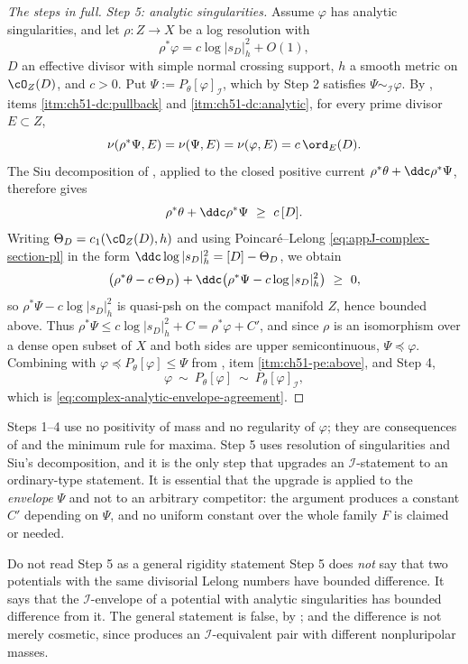 \begin{proof}[The steps in full]
\emph{Step 5: analytic singularities.}  Assume \(\varphi\) has analytic
singularities, and let \(\rho:Z\to X\) be a log resolution with
\[
 \rho^*\varphi=c\log|s_D|_h^2+O(1),
\]
\(D\) an effective divisor with simple normal crossing support, \(h\) a
smooth metric on \(\cO_Z(D)\), and \(c>0\).  Put
\(\Psi:=P_\theta[\varphi]_{\mathcal I}\), which by Step 2 satisfies
\(\Psi\sim_{\mathcal I}\varphi\).  By
, items
\cref{itm:ch51-dc:pullback} and \cref{itm:ch51-dc:analytic}, for every
prime divisor \(E\subset Z\),
\[
 \nu(\rho^*\Psi,E)=\nu(\Psi,E)=\nu(\varphi,E)=c\,\ord_E(D).
\]
The Siu decomposition of , applied to the
closed positive current \(\rho^*\theta+\ddc\rho^*\Psi\), therefore gives
\[
 \rho^*\theta+\ddc\rho^*\Psi\ \geq\ c\,[D].
\]
Writing \(\Theta_D=c_1(\cO_Z(D),h)\) and using Poincar\'e--Lelong
\eqref{eq:appJ-complex-section-pl} in the form
\(\ddc\log|s_D|_h^2=[D]-\Theta_D\), we obtain
\[
 \bigl(\rho^*\theta-c\,\Theta_D\bigr)
 +\ddc\bigl(\rho^*\Psi-c\log|s_D|_h^2\bigr)\ \geq\ 0 ,
\]
so \(\rho^*\Psi-c\log|s_D|_h^2\) is quasi-psh on the compact manifold
\(Z\), hence bounded above.  Thus
\(\rho^*\Psi\leq c\log|s_D|_h^2+C=\rho^*\varphi+C'\), and since \(\rho\)
is an isomorphism over a dense open subset of \(X\) and both sides are
upper semicontinuous, \(\Psi\preceq\varphi\).  Combining with
\(\varphi\preceq P_\theta[\varphi]\leq\Psi\) from
, item \cref{itm:ch51-pe:above}, and Step 4,
\[
 \varphi\ \sim\ P_\theta[\varphi]\ \sim\ P_\theta[\varphi]_{\mathcal I},
\]
which is \eqref{eq:complex-analytic-envelope-agreement}.
\end{proof}

\begin{remark}
\label{rem:ch51-i-projection-hypotheses}
Steps 1--4 use no positivity of mass and no regularity of \(\varphi\);
they are consequences of  and the
minimum rule for maxima.  Step 5 uses resolution of singularities and
Siu's decomposition, and it is the only step that upgrades an
\(\mathcal I\)-statement to an ordinary-type statement.  It is essential
that the upgrade is applied to the \emph{envelope} \(\Psi\) and not to an
arbitrary competitor: the argument produces a constant \(C'\) depending
on \(\Psi\), and no uniform constant over the whole family \(F\) is
claimed or needed.
\end{remark}

\begin{warning}{Do not read Step 5 as a general rigidity statement}
\label{warn:ch51-step5}
Step 5 does \emph{not} say that two potentials with the same divisorial
Lelong numbers have bounded difference.  It says that the
\(\mathcal I\)-envelope of a potential with analytic singularities has
bounded difference from it.  The general statement is false, by
; and the difference is not merely
cosmetic, since  produces an
\(\mathcal I\)-equivalent pair with different nonpluripolar masses.
\end{warning}

